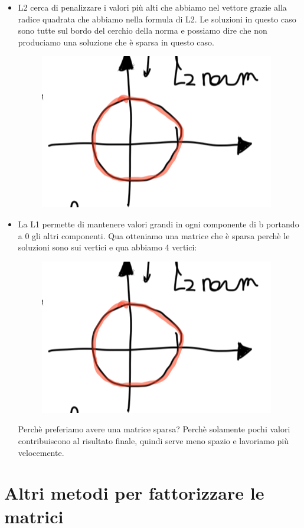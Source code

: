 \documentclass[14pt]{extreport}
\begin{document}
\begin{itemize}
\item L2 cerca di penalizzare i valori più alti che abbiamo nel vettore grazie alla radice quadrata che abbiamo nella formula di L2.
Le soluzioni in questo caso sono tutte sul bordo del cerchio della norma e possiamo dire che non produciamo una soluzione che è sparsa in questo caso.
\begin{figure}[H] 
\centering
\includegraphics[width=0.7\linewidth]{527.jpeg}
\end{figure}
\item La L1 permette di mantenere valori grandi in ogni componente di b portando a 0 gli altri componenti. Qua otteniamo una matrice che è sparsa 
perchè le soluzioni sono sui vertici e qua abbiamo 4 vertici:
\begin{figure}[H] 
\centering
\includegraphics[width=0.7\linewidth]{527.jpeg}
\end{figure}
Perchè preferiamo avere una matrice sparsa? Perchè solamente pochi valori contribuiscono al risultato finale, quindi serve meno spazio e lavoriamo più velocemente.
\end{itemize}

\section{Altri metodi per fattorizzare le matrici}
\end{document}
